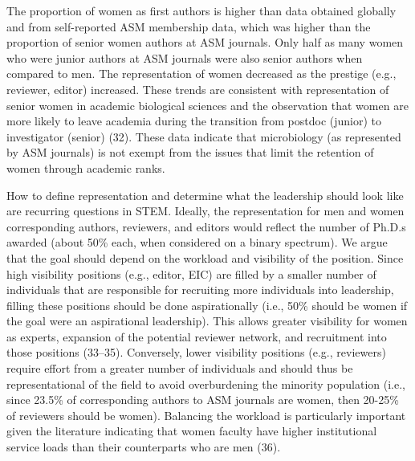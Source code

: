 \documentclass[11pt,]{article}
\begin{document}
The proportion of women as first authors is higher than data obtained
globally and from self-reported ASM membership data, which was higher
than the proportion of senior women authors at ASM journals. Only half
as many women who were junior authors at ASM journals were also senior
authors when compared to men. The representation of women decreased as
the prestige (e.g., reviewer, editor) increased. These trends are
consistent with representation of senior women in academic biological
sciences and the observation that women are more likely to leave
academia during the transition from postdoc (junior) to investigator
(senior) (32). These data indicate that microbiology (as represented by
ASM journals) is not exempt from the issues that limit the retention of
women through academic ranks.

How to define representation and determine what the leadership should
look like are recurring questions in STEM. Ideally, the representation
for men and women corresponding authors, reviewers, and editors would
reflect the number of Ph.D.s awarded (about 50\% each, when considered
on a binary spectrum). We argue that the goal should depend on the
workload and visibility of the position. Since high visibility positions
(e.g., editor, EIC) are filled by a smaller number of individuals that
are responsible for recruiting more individuals into leadership, filling
these positions should be done aspirationally (i.e., 50\% should be
women if the goal were an aspirational leadership). This allows greater
visibility for women as experts, expansion of the potential reviewer
network, and recruitment into those positions (33--35). Conversely,
lower visibility positions (e.g., reviewers) require effort from a
greater number of individuals and should thus be representational of the
field to avoid overburdening the minority population (i.e., since 23.5\%
of corresponding authors to ASM journals are women, then 20-25\% of
reviewers should be women). Balancing the workload is particularly
important given the literature indicating that women faculty have higher
institutional service loads than their counterparts who are men (36).
\end{document}
